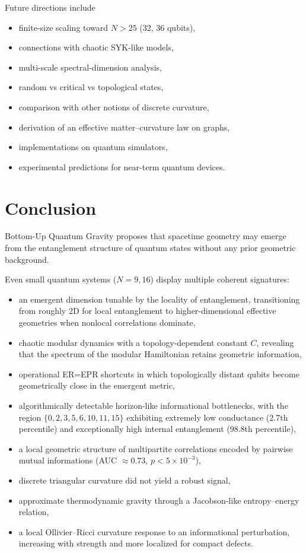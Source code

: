 \documentclass[11pt]{article}
\begin{document}
Future directions include

\begin{itemize}
\item finite-size scaling toward $N>25$ (32, 36 qubits),
\item connections with chaotic SYK-like models,
\item multi-scale spectral-dimension analysis,
\item random vs critical vs topological states,
\item comparison with other notions of discrete curvature,
\item derivation of an effective matter--curvature law on graphs,
\item implementations on quantum simulators,
\item experimental predictions for near-term quantum devices.
\end{itemize}


\section{Conclusion}

Bottom-Up Quantum Gravity proposes that spacetime geometry may emerge from the entanglement structure of quantum states without any prior geometric background.

Even small quantum systems ($N=9,16$) display multiple coherent signatures:

\begin{itemize}
\item an emergent dimension tunable by the locality of entanglement, transitioning from roughly 2D for local entanglement to higher-dimensional effective geometries when nonlocal correlations dominate,
\item chaotic modular dynamics with a topology-dependent constant $C$, revealing that the spectrum of the modular Hamiltonian retains geometric information,
\item operational ER=EPR shortcuts in which topologically distant qubits become geometrically close in the emergent metric,
\item algorithmically detectable horizon-like informational bottlenecks, with the region $\{0,2,3,5,6,10,11,15\}$ exhibiting extremely low conductance (2.7th percentile) and exceptionally high internal entanglement (98.8th percentile),
\item a local geometric structure of multipartite correlations encoded by pairwise mutual informations (AUC $\approx 0.73$, $p<5\times10^{-3}$),
\item discrete triangular curvature did not yield a robust signal,
\item approximate thermodynamic gravity through a Jacobson-like entropy--energy relation,
\item a local Ollivier--Ricci curvature response to an informational perturbation, increasing with strength and more localized for compact defects.
\end{itemize}
\end{document}
